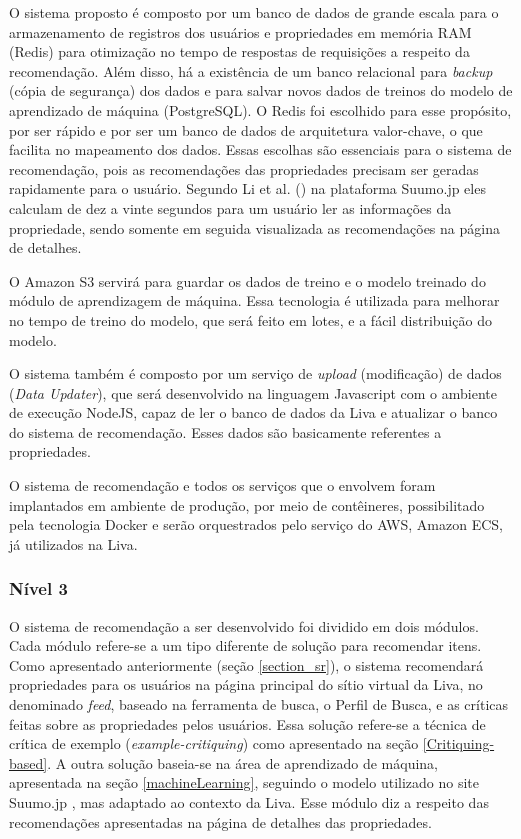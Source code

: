 O sistema proposto é composto por um banco de dados de grande escala para o armazenamento de registros dos usuários e propriedades em memória RAM (Redis) para otimização no tempo de respostas de requisições a respeito da recomendação. Além disso, há a existência de um banco relacional para \textit{backup} (cópia de segurança) dos dados e para salvar novos dados de treinos do modelo de aprendizado de máquina (PostgreSQL). O Redis foi escolhido para esse propósito, por ser rápido e por ser um banco de dados de arquitetura valor-chave, o que facilita no mapeamento dos dados. Essas escolhas são essenciais para o sistema de recomendação, pois as recomendações das propriedades precisam ser geradas rapidamente para o usuário. Segundo Li et al. (\citeyear{Summo:2017}) na plataforma Suumo.jp eles calculam de dez a vinte segundos para um usuário ler as informações da propriedade, sendo somente em seguida visualizada as recomendações na página de detalhes.

O Amazon S3 servirá para guardar os dados de treino e o modelo treinado do módulo de aprendizagem de máquina. Essa tecnologia é utilizada para melhorar no tempo de treino do modelo, que será feito em lotes, e a fácil distribuição do modelo.

O sistema também é composto por um serviço de \textit{upload} (modificação) de dados (\textit{Data Updater}), que será desenvolvido na linguagem Javascript com o ambiente de execução NodeJS, capaz de ler o banco de dados da Liva e atualizar o banco do sistema de recomendação. Esses dados são basicamente referentes a propriedades.

O sistema de recomendação e todos os serviços que o envolvem foram implantados em ambiente de produção, por meio de contêineres, possibilitado pela tecnologia Docker e serão orquestrados pelo serviço do AWS, Amazon ECS, já utilizados na Liva.
	
\subsubsection{Nível 3}
\label{nivel3}

O sistema de recomendação a ser desenvolvido foi dividido em dois módulos. Cada módulo refere-se a um tipo diferente de solução para recomendar itens. Como apresentado anteriormente (seção \ref{section_sr}), o sistema recomendará propriedades para os usuários na página principal do sítio virtual da Liva, no denominado \textit{feed}, baseado na ferramenta de busca, o Perfil de Busca, e as críticas feitas sobre as propriedades pelos usuários. Essa solução refere-se a técnica de crítica de exemplo (\textit{example-critiquing}) como apresentado na seção \ref{Critiquing-based}. A outra solução baseia-se na área de aprendizado de máquina, apresentada na seção \ref{machineLearning}, seguindo o modelo utilizado no site Suumo.jp \cite{Summo:2017}, mas adaptado ao contexto da Liva. Esse módulo diz a respeito das recomendações apresentadas na página de detalhes das propriedades.

